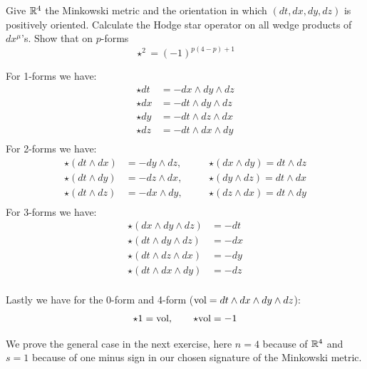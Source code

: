 \documentclass[10pt]{article}
\begin{document}
\begin{example}\label{b1e67}
	Give $\mathbb{R}^4$ the Minkowski metric and the orientation in which $(dt,dx,dy,dz)$ is positively oriented. Calculate the Hodge star operator on all wedge products of $dx^\mu$'s. Show that on $p$-forms
	$$
		\star^2 = (-1)^{p(4-p)+1}
	$$
\end{example}
\sol For 1-forms we have:
$$
\begin{aligned}
	\star dt &= -dx \wedge dy \wedge dz\\
	\star dx &= -dt \wedge dy \wedge dz\\
	\star dy &= -dt \wedge dz \wedge dx\\
	\star dz &= -dt \wedge dx \wedge dy\\
\end{aligned}
$$
For 2-forms we have:
$$
\begin{aligned}
	\star(dt \wedge dx) &= -dy \wedge dz, \quad &&\star(dx \wedge dy) = dt \wedge dz\\
	\star(dt \wedge dy) &= -dz \wedge dx, \quad &&\star(dy \wedge dz) = dt \wedge dx\\
	\star(dt \wedge dz) &= -dx \wedge dy, \quad &&\star(dz \wedge dx) = dt \wedge dy\\
\end{aligned}
$$
For 3-forms we have:
$$
\begin{aligned}
	\star (dx \wedge dy \wedge dz) &= -dt\\
	\star (dt \wedge dy \wedge dz) &= -dx\\
	\star (dt \wedge dz \wedge dx) &= -dy\\
	\star (dt \wedge dx \wedge dy) &= -dz\\
\end{aligned}
$$

Lastly we have for the 0-form and 4-form ($\text{vol} = dt \wedge dx \wedge dy \wedge dz$):
$$
\star 1 = \text{vol}, \qquad \star\text{vol} = -1
$$

We prove the general case in the next exercise, here $n=4$ because of $\mathbb{R}^4$ and $s=1$ because of one minus sign in our chosen signature of the Minkowski metric.
\end{document}
